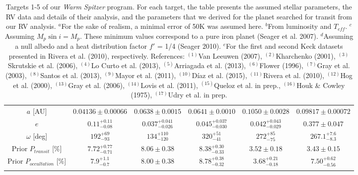 \documentclass[traditabstract]{aa}
\begin{document}
\begin{appendix}
\begin{table*}
\begin{center}
{\begin{tabular}{cccccc}
$a$ [AU]                                 & $0.04136 \pm 0.00066$     & $0.0638 \pm 0.0015$          & $0.0641 \pm 0.0010$          & $0.1050 \pm 0.0028$                      &  $0.09817 \pm 0.00072$ \\ \noalign {\smallskip} 
 $e$                                        & $0.11_{-0.08}^{+0.11}$       & $0.037_{-0.026}^{+0.041}$ &$0.045_{-0.030}^{+0.037}$  & $0.042_{-0.029}^{+0.043}$             & $0.377 \pm 0.047$  \\ \noalign {\smallskip}
 $\omega$ [deg]                     & $192_{-93}^{+69}$              & $134_{-120}^{+110}$          & $320_{-41}^{+51}$              & $272_{-75}^{+85}$                          & $267.1_{-8.3}^{+7.6}$    \\ \noalign {\smallskip} 
Prior $P_{transit}$ [\%]           & $7.72_{-0.71}^{+0.77}$       & $8.06 \pm 0.38$                   & $8.38_{-0.33}^{+0.30}$     & $3.52 \pm 0.18$                              & $3.43 \pm 0.15$ \\ \noalign {\smallskip} 
Prior $P_{occultation}$ [\%]    & $7.9_{-0.7}^{+1.1}$            & $8.00 \pm 0.38$                  &  $8.78_{-0.32}^{+0.38}$      & $3.68_{-0.18}^{+0.21}$                   & $7.50_{-0.56}^{+0.62}$   \\ \noalign {\smallskip} 
\hline \noalign {\smallskip} 
\end{tabular}
}
\end{center}
\caption{Targets 1-5 of our {\it  Warm Spitzer} program. For each target, the table presents the assumed stellar parameters, the RV data and details of their 
analysis, and the parameters that we derived for the planet searched for transit from our RV analysis. $^a$For the sake of realism, a minimal error of 50K was assumed here. $^b$From 
luminosity and $T_{eff}$. $^c$Assuming $M_p \sin{i} = M_p$. These minimum values correspond to a pure iron planet (Seager et
 al. 2007). $^d$Assuming a null albedo and a heat distribution factor $f'$ = 1/4 (Seager 2010). $^e$For the first and second Keck datasets presented 
 in Rivera et al. (2010), respectively. References: $^{(1)}$Van Leeuwen (2007),  $^{(2)}$Kharchenko (2001), $^{(3)}$Skrutskie et al. (2006), $^{(4)}$Lo Curto et al. (2013), $^{(5)}$Arriagada et al. (2013), $^{(6)}$Flower (1996), $^{(7)}$Gray et al. (2003), $^{(8)}$Santos et al. (2013),  $^{(9)}$Mayor et al. (2011), $^{(10)}$D\'iaz et al. (2015), $^{(11)}$Rivera et al. (2010), $^{(12)}$Hog et al. (2000), $^{(13)}$Gray et al. (2006), 
 $^{(14)}$Lovis et al. (2011), $^{(15)}$Queloz et al. in prep., $^{(16)}$Houk \& Cowley (1975), $^{(17)}$Udry et al. in prep.}
\end{table*}


\end{appendix}
\end{document}
